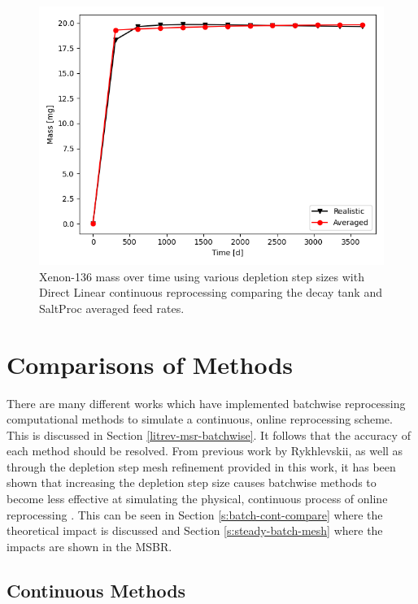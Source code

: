 \begin{figure}[H]
  \centering
  \includegraphics[scale=0.7]{images/adv-Xe136.png}
  \caption{Xenon-136 mass over time using various depletion step sizes with Direct Linear continuous reprocessing comparing the decay tank and SaltProc averaged feed rates.}
   \label{fig:DL-cont-xe136-adv}
\end{figure}

\section{Comparisons of Methods}

There are many different works which have implemented batchwise reprocessing computational methods to simulate a continuous, online reprocessing scheme.
This is discussed in Section \ref{litrev-msr-batchwise}.
It follows that the accuracy of each method should be resolved.
From previous work by Rykhlevskii, as well as through the depletion step mesh refinement provided in this work, it has been shown that increasing the depletion step size causes batchwise methods to become less effective at simulating the physical, continuous process of online reprocessing \cite{rykhlevskii_fuel_2020}.
This can be seen in Section \ref{s:batch-cont-compare} where the theoretical impact is discussed and Section \ref{s:steady-batch-mesh} where the impacts are shown in the MSBR.

\subsection{Continuous Methods}

